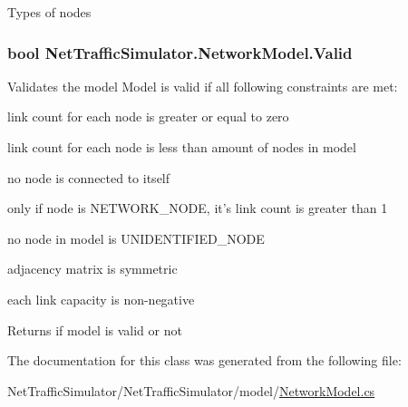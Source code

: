 Types of nodes \hypertarget{classNetTrafficSimulator_1_1NetworkModel_a58af85d9a9121926149ef5e2ce332e76}{
\subsubsection[{Valid}]{\setlength{\rightskip}{0pt plus 5cm}bool Net\-Traffic\-Simulator.\-Network\-Model.\-Valid\hspace{0.3cm}{\ttfamily [get]}}}\label{classNetTrafficSimulator_1_1NetworkModel_a58af85d9a9121926149ef5e2ce332e76}
Validates the model Model is valid if all following constraints are met\-:
\begin{DoxyItemize}
\item link count for each node is greater or equal to zero
\item link count for each node is less than amount of nodes in model
\item no node is connected to itself
\item only if node is N\-E\-T\-W\-O\-R\-K\-\_\-\-N\-O\-D\-E, it's link count is greater than 1
\item no node in model is U\-N\-I\-D\-E\-N\-T\-I\-F\-I\-E\-D\-\_\-\-N\-O\-D\-E
\item adjacency matrix is symmetric
\item each link capacity is non-\/negative \begin{DoxyReturn}{Returns}
if model is valid or not 
\end{DoxyReturn}

\end{DoxyItemize}

The documentation for this class was generated from the following file\-:\begin{DoxyCompactItemize}
\item 
Net\-Traffic\-Simulator/\-Net\-Traffic\-Simulator/model/\hyperlink{NetworkModel_8cs}{Network\-Model.\-cs}\end{DoxyCompactItemize}

